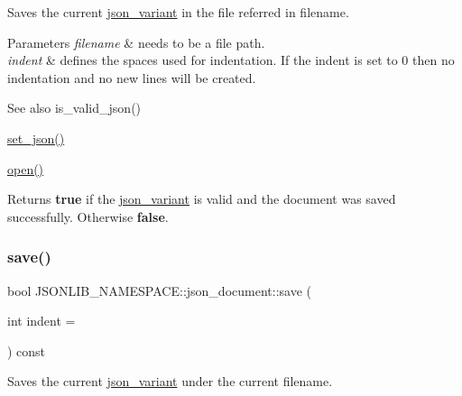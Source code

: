Saves the current \hyperlink{classJSONLIB__NAMESPACE_1_1json__variant}{json\+\_\+variant} in the file referred in {\ttfamily filename}. 


\begin{DoxyParams}{Parameters}
{\em filename} & needs to be a file path. \\
\hline
{\em indent} & defines the spaces used for indentation. If the indent is set to 0 then no indentation and no new lines will be created. \\
\hline
\end{DoxyParams}
\begin{DoxySeeAlso}{See also}
is\+\_\+valid\+\_\+json() 

\hyperlink{classJSONLIB__NAMESPACE_1_1json__document_a5a72e4dc0b37b95c70baefad930b5b71}{set\+\_\+json()} 

\hyperlink{classJSONLIB__NAMESPACE_1_1json__document_a08e509059e628742f35716dddce2d740}{open()} 
\end{DoxySeeAlso}
\begin{DoxyReturn}{Returns}
{\bfseries true} if the \hyperlink{classJSONLIB__NAMESPACE_1_1json__variant}{json\+\_\+variant} is valid and the document was saved successfully. Otherwise {\bfseries false}. 
\end{DoxyReturn}
\mbox{\label{classJSONLIB__NAMESPACE_1_1json__document_a861865e1aae02c2de80eb60a4a8bd668}} 
\subsubsection{\texorpdfstring{save()}{save()}\hspace{0.1cm}{\footnotesize\ttfamily [3/6]}}
{\footnotesize\ttfamily bool J\+S\+O\+N\+L\+I\+B\+\_\+\+N\+A\+M\+E\+S\+P\+A\+C\+E\+::json\+\_\+document\+::save (\begin{DoxyParamCaption}\item[{int}]{indent = {} }\end{DoxyParamCaption}) const}



Saves the current \hyperlink{classJSONLIB__NAMESPACE_1_1json__variant}{json\+\_\+variant} under the current filename. 


